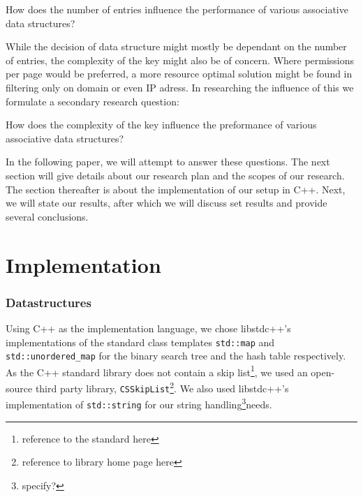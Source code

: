 \documentclass[12pt,a4paper]{article}
\begin{document}
    How does the number of entries influence the performance of various associative data structures?
    
    While the decision of data structure might mostly be dependant on the number of entries, the complexity
    of the key might also be of concern. Where permissions per page would be preferred, a more
    resource optimal solution might be found in filtering only on domain or even IP adress.
    In researching the influence of this we formulate a secondary research question:
    
    How does the complexity of the key influence the preformance of various associative data structures?
    
    In the following paper, we will attempt to answer these questions. The next section will give details
    about our research plan and the scopes of our research. The section thereafter is about the implementation
    of our setup in C++. Next, we will state our results, after which we will discuss set results and provide
    several conclusions.    
    \section{Implementation}
    \subsubsection*{Datastructures}

    Using C++ as the implementation language, we chose libstdc++'s implementations of the standard class
    templates \texttt{std::map} and \texttt{std::unordered\_map} for the binary search
    tree and the hash table respectively.  As the C++ standard library does not contain a skip
    list\footnote{reference to the standard here}, we used an open-source third party library,
    \texttt{CSSkipList}\footnote{reference to library home page here}.  We also used libstdc++'s
    implementation of \texttt{std::string} for our string handling\footnote{specify?}needs.
    
\end{document}
